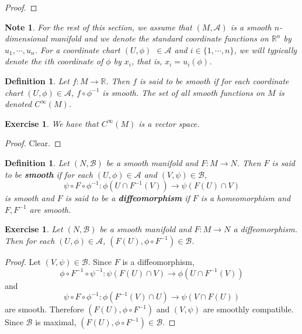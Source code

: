 \documentclass[12pt]{amsart}
\newtheorem{defn}[thm]{Definition}
\newtheorem{note}[thm]{Note}
\newtheorem{ex}[thm]{Exercise}
\newcommand{\R}{\mathbb{R}}
\newcommand{\MA}{\mathcal{A}}
\newcommand{\MB}{\mathcal{B}}
\begin{document}
	\begin{proof}
		
	\end{proof}
	
	\begin{note}
		For the rest of this section, we assume that $(M, \MA)$ is a smooth $n$-dimensional manifold and we denote the standard coordinate functions on $\R^n$ by $u_1, \cdots, u_n$. For a coordinate chart $(U, \phi)$ $\in \MA$ and $i \in \{1, \cdots, n\}$, we will typically denote the $i$th coordinate of $\phi$ by $x_i$, that is,  $x_i = u_i(\phi)$.
	\end{note}
	
	\begin{defn}
		Let $f: M \rightarrow \R$. Then $f$ is said to be smooth if for each coordinate chart $(U, \phi) \in \MA$, $f \circ \phi^{-1}$ is smooth. The set of all smooth functions on $M$ is denoted $C^{\infty}(M)$. 
	\end{defn}

	\begin{ex}
		We have that $C^{\infty}(M)$ is a vector space.
	\end{ex}

	\begin{proof}
		Clear.
	\end{proof}

	\begin{defn}
		Let $(N, \MB)$ be a smooth manifold and $F: M \rightarrow N$. Then $F$ is said to be \textbf{smooth} if for each $(U, \phi) \in \MA$ and $(V, \psi) \in \MB$, $$\psi \circ F \circ \phi^{-1}: \phi(U \cap F^{-1}(V)) \rightarrow \psi(F(U) \cap V)$$ is smooth and $F$ is said to be a \textbf{diffeomorphism} if $F$ is a homeomorphism and $F,F^{-1}$ are smooth.
	\end{defn}
	
	\begin{ex}
		Let $(N, \MB)$ be a smooth manifold and $F: M \rightarrow N$ a diffeomorphism. Then for each $(U, \phi) \in \MA$, $(F(U), \phi \circ F^{-1}) \in \MB$.
	\end{ex}
	
	\begin{proof}
		Let $(V, \psi) \in \MB$. Since $F$ is a diffeomorphism, $$\phi \circ F^{-1} \circ \psi^{-1}: \psi(F(U) \cap V) \rightarrow \phi(U \cap F^{-1}(V))$$ and $$\psi \circ F \circ \phi^{-1}: \phi(F^{-1}(V) \cap U) \rightarrow \psi(V \cap F(U))$$ are smooth. Therefore $(F(U), \phi \circ F^{-1})$ and $(V, \psi)$ are smoothly compatible. Since $\MB$ is maximal, $(F(U), \phi \circ F^{-1}) \in \MB$.
	\end{proof}
\end{document}
